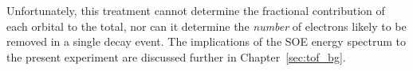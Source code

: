 Unfortunately, this treatment cannot determine the fractional contribution of each orbital to the total, nor can it determine the \emph{number} of electrons likely to be removed in a single decay event.  The implications of the \ac{SOE} energy spectrum to the present experiment are discussed further in Chapter~\ref{sec:tof_bg}.









